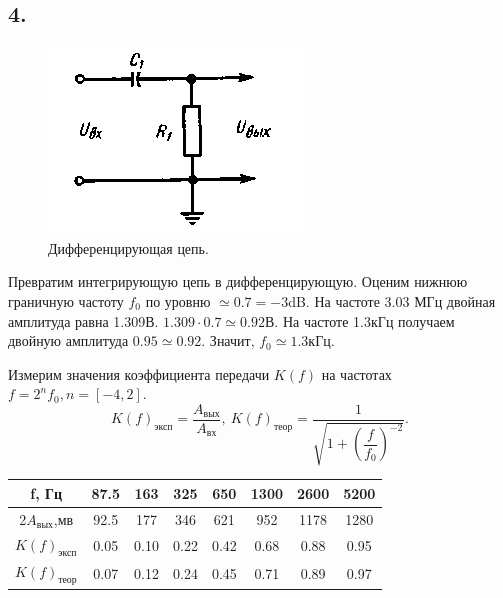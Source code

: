 \documentclass[a4paper, 12pt, twoside]{article}
\begin{document}
\subsection*{4.}
\begin{figure}
	\includegraphics[width =  \linewidth]{diff}
	\caption{Дифференцирующая цепь.}
	\label{RLC}
\end{figure}
Превратим интегрирующую цепь в дифференцирующую. Оценим нижнюю граничную частоту $f_0$ по уровню $\simeq 0.7 = -3$dB. На частоте 3.03 МГц двойная амплитуда равна 1.309В. $1.309 \cdot0.7\simeq 0.92$В. На частоте 1.3кГц получаем двойную амплитуда $0.95 \simeq 0.92$. Значит, \underline{$f_0\simeq 1.3\text{кГц}$}.

Измерим значения коэффициента передачи $K(f)$ на частотах $f = 2^nf_0, n = [-4,2]$.
$$K(f)_{\text{эксп}} = \dfrac{A_{\text{вых}}}{A_{\text{вх}}}, ~  K(f)_{\text{теор}} = \dfrac{1}{\sqrt{1+\left (\dfrac{f}{f_0}\right )^{-2}}}.  $$

\begin{table}[H]
	\centering
	\begin{tabular}{|c|c|c|c|c|c|c|c|}
		\hline
		f, Гц                & 87.5 & 163  & 325  & 650  & 1300 & 2600 & 5200 \\ \hline
		2$A_{\text{вых}}$,мв & 92.5 & 177  & 346  & 621  & 952  & 1178 & 1280 \\ \hline
		$K(f)_{\text{эксп}}$ & 0.05 & 0.10 & 0.22 & 0.42 & 0.68 & 0.88 & 0.95 \\ \hline
		$K(f)_{\text{теор}}$ & 0.07 & 0.12 & 0.24 & 0.45 & 0.71 & 0.89 & 0.97 \\ \hline
	\end{tabular}
\end{table}
\end{document}
